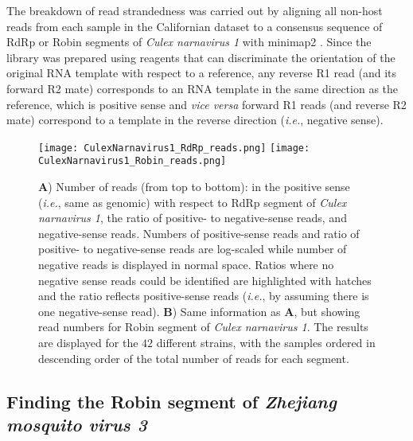 \documentclass[unnumsec,webpdf,contemporary,large]{oup-authoring-template}%
\theoremstyle{thmstyleone}%
\theoremstyle{thmstyletwo}%
\theoremstyle{thmstylethree}%
\begin{document}
The breakdown of read strandedness was carried out by aligning all non-host
reads from each sample in the Californian dataset \citep{Bat+20} to a consensus
sequence of RdRp or Robin segments of \emph{Culex narnavirus 1} with minimap2
\citep{li+18}. Since the library was prepared using reagents that can
discriminate the orientation of the original RNA template with respect to a
reference, any reverse R1 read (and its forward R2 mate) corresponds to an RNA
template in the same direction as the reference, which is positive sense and
\textit{vice versa} forward R1 reads (and reverse R2 mate) correspond to a
template in the reverse direction (\textit{i.e.}, negative sense).

\begin{figure*}
  \texttt{[image: CulexNarnavirus1\_RdRp\_reads.png]}
  \texttt{[image: CulexNarnavirus1\_Robin\_reads.png]}

  \caption{
    \label{fig: S}
  \textbf{A}) Number of reads (from top to bottom): in the positive sense
(\textit{i.e.}, same as genomic) with respect to RdRp segment of \emph{Culex
narnavirus 1}, the ratio of positive- to negative-sense reads, and
negative-sense reads. Numbers of positive-sense reads and ratio of positive- to
negative-sense reads are log-scaled while number of negative reads is displayed
in normal space. Ratios where no negative sense reads could be identified are
highlighted with hatches and the ratio reflects positive-sense reads
(\textit{i.e.}, by assuming there is one negative-sense read).  \textbf{B})
Same information as \textbf{A}, but showing read numbers for Robin segment of
\emph{Culex narnavirus 1}. The results are displayed for the $42$ different
strains, with the samples ordered in descending order of the total number
of reads for each segment.}
\end{figure*}



\subsection{\textbf{Finding the Robin segment of \emph{Zhejiang mosquito virus 3}}}
\label{sec: 4.5}
\end{document}
